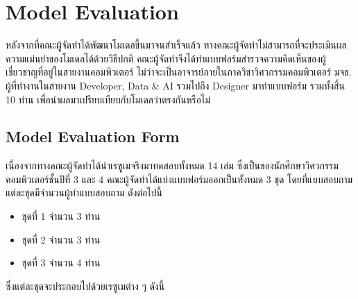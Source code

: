 \section{Model Evaluation}
หลังจากที่คณะผู้จัดทำได้พัฒนาโมเดลขึ้นมาจนสำเร็จแล้ว ทางคณะผู้จัดทำไม่สามารถที่จะประเมินผลความแม่นยำของโมเดลได้ด้วยวิธีปกติ
คณะผู้จัดทำจึงได้ทำแบบฟอร์มสำรวจความคิดเห็นของผู้เชี่ยวชาญที่อยู่ในสายงานคอมพิวเตอร์ ไม่ว่าจะเป็นอาจารย์ภายในภาควิชาวิศวกรรมคอมพิวเตอร์ มจธ.
ผู้ที่ทำงานในสายงาน Developer, Data \& AI รวมไปถึง Designer มาทำแบบฟอร์ม รวมทั้งสิ้น 10 ท่าน เพื่อนำผลมาเปรียบเทียบกับโมเดลว่าตรงกันหรือไม่
\subsection{Model Evaluation Form}
เนื่องจากทางคณะผู้จัดทำได้นำเรซูเมจริงมาทดสอบทั้งหมด 14 เล่ม ซึ่งเป็นของนักศึกษาวิศวกรรมคอมพิวเตอร์ชั้นปีที่ 3 และ 4
คณะผู้จัดทำได้แบ่งแบบฟอร์มออกเป็นทั้งหมด 3 ชุด โดยที่แบบสอบถามแต่ละชุดมีจำนวนผู้ทำแบบสอบถาม ดังต่อไปนี้
\begin{itemize}
    \item ชุดที่ 1 จำนวน 3 ท่าน
    \item ชุดที่ 2 จำนวน 3 ท่าน
    \item ชุดที่ 3 จำนวน 4 ท่าน
\end{itemize}
ซึ่งแต่ละชุดจะประกอบไปด้วยเรซูเมต่าง ๆ ดังนี้
